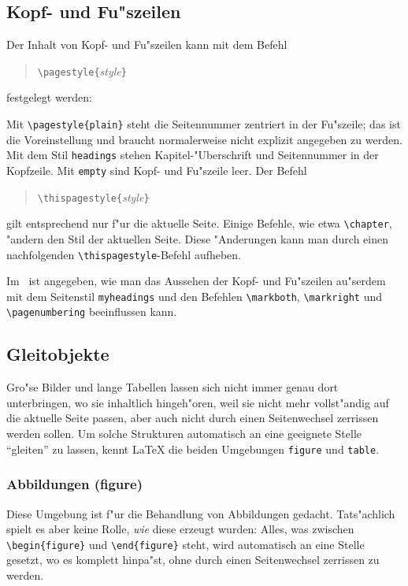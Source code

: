 \subsection{Kopf- und Fu"szeilen} 
Der Inhalt von Kopf- und  Fu"szeilen kann mit dem Befehl
\begin{verse}
\verb|\pagestyle{|\textit{style}\verb|}|
\end{verse}
festgelegt werden:
 
Mit \verb|\pagestyle{plain}| steht
die Seitennummer zentriert in der Fu"szeile; 
das ist die Voreinstellung und braucht normalerweise nicht explizit 
angegeben zu werden.
Mit dem Stil \texttt{headings} stehen Kapitel-"Uberschrift und
Seitennummer in der Kopfzeile.
Mit \texttt{empty} sind Kopf- und Fu"szeile leer.  Der Befehl
\begin{verse}
\verb|\thispagestyle{|\textit{style}\verb|}|
\end{verse}
gilt entsprechend nur f"ur die aktuelle Seite.  Einige Befehle, wie etwa
\verb|\chapter|, "andern den Stil der aktuellen Seite.  Diese "Anderungen 
kann man durch einen nachfolgenden \verb|\thispagestyle|-Befehl aufheben.

\begin{sloppypar}%
\relax %
Im \manual\ ist angegeben, wie man das Aussehen der Kopf- und Fu"szeilen
au"serdem mit dem Seitenstil 
\verb|myheadings| und den Befehlen
\verb|\markboth|,
\verb|\markright| und
\verb|\pagenumbering|
beeinflussen kann.
\end{sloppypar}

\subsection{Gleitobjekte} \label{floats}
Gro"se Bilder und lange Tabellen lassen sich nicht immer genau 
dort unterbringen, wo sie inhaltlich hingeh"oren, weil sie nicht mehr 
vollst"andig auf die aktuelle Seite passen, aber auch nicht durch einen 
Seitenwechsel zerrissen werden sollen.  Um  solche Strukturen automatisch
an eine geeignete Stelle "`gleiten"' zu lassen, kennt \LaTeX{} die beiden 
Umgebungen \texttt{figure} und \texttt{table}.  

\subsubsection{Abbildungen (figure)}
Diese Umgebung ist f"ur die Behandlung von Abbildungen gedacht.
Tats"achlich spielt es aber keine Rolle, \emph{wie} diese erzeugt wurden:
Alles, was zwischen
\verb|\begin{figure}| und \verb|\end{figure}|
steht, wird automatisch an eine Stelle
gesetzt, wo es komplett hinpa"st, ohne durch einen Seitenwechsel
zerrissen zu werden.  


